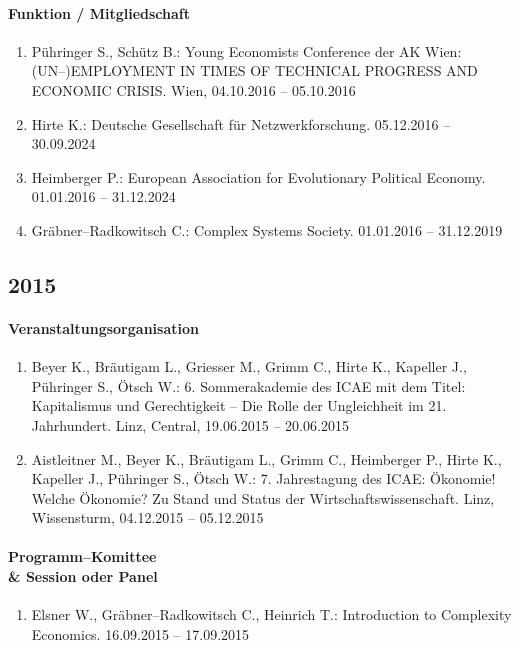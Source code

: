 \paragraph{Funktion / Mitgliedschaft}
\begin{enumerate}[leftmargin=*, labelsep=0.5cm]
\item Pühringer S., Schütz B.: Young Economists Conference der AK Wien: (UN--)EMPLOYMENT IN TIMES OF TECHNICAL PROGRESS AND ECONOMIC CRISIS. Wien, 04.10.2016 -- 05.10.2016
\item Hirte K.: Deutsche Gesellschaft für Netzwerkforschung. 05.12.2016 -- 30.09.2024
\item Heimberger P.: European Association for Evolutionary Political Economy. 01.01.2016 -- 31.12.2024
\item Gräbner--Radkowitsch C.: Complex Systems Society. 01.01.2016 -- 31.12.2019
\end{enumerate}
\subsection*{2015}
\paragraph{Veranstaltungsorganisation}
\begin{enumerate}[leftmargin=*, labelsep=0.5cm]
\item Beyer K., Bräutigam L., Griesser M., Grimm C., Hirte K., Kapeller J., Pühringer S., Ötsch W.: 6. Sommerakademie des ICAE mit dem Titel: Kapitalismus und Gerechtigkeit -- Die Rolle der Ungleichheit im 21. Jahrhundert. Linz, Central, 19.06.2015 -- 20.06.2015
\item Aistleitner M., Beyer K., Bräutigam L., Grimm C., Heimberger P., Hirte K., Kapeller J., Pühringer S., Ötsch W.: 7. Jahrestagung des ICAE: Ökonomie! Welche Ökonomie? Zu Stand und Status der Wirtschaftswissenschaft. Linz, Wissensturm, 04.12.2015 -- 05.12.2015
\end{enumerate}

\paragraph{Programm--Komittee \\\& Session oder Panel}
\begin{enumerate}[leftmargin=*, labelsep=0.5cm]
\item Elsner W., Gräbner--Radkowitsch C., Heinrich T.: Introduction to Complexity Economics. 16.09.2015 -- 17.09.2015
\end{enumerate}

